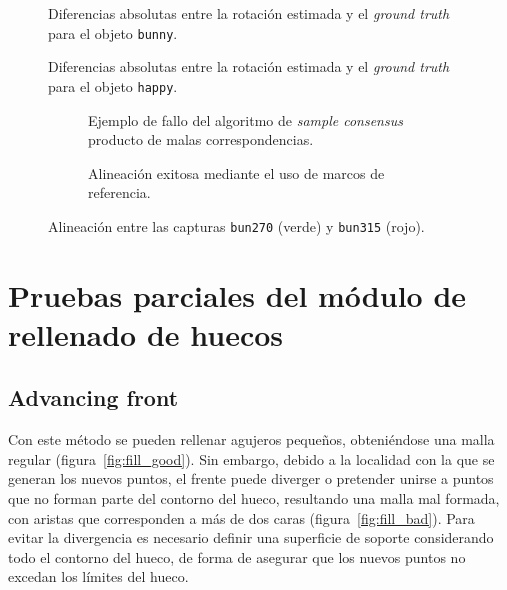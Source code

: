 	\begin{figure}
		\caption{\label{fig:sac_angles}}
	\end{figure}


\begin{figure}
	\resizebox{.9\linewidth}{!}{}
	\caption{\label{fig:clust_bunny}Diferencias absolutas entre la rotación estimada y el \emph{ground truth} para el objeto \texttt{bunny}.}
\end{figure}

\begin{figure}
	\resizebox{.9\linewidth}{!}{}
	\caption{\label{fig:clust_happy}Diferencias absolutas entre la rotación estimada y el \emph{ground truth} para el objeto \texttt{happy}.}
\end{figure}

\begin{figure}
	\centering
	\begin{subfigure}{.8\linewidth}
		\caption{\label{fig:align_sac}Ejemplo de fallo del algoritmo de \emph{sample consensus} producto de malas correspondencias.}
	\end{subfigure}
	\begin{subfigure}{.8\linewidth}
		\caption{\label{fig:clust_bun_good}Alineación exitosa mediante el uso de marcos de referencia.}
	\end{subfigure}
	\caption{Alineación entre las capturas \texttt{bun270} (verde) y \texttt{bun315} (rojo).}
\end{figure}

\section{Pruebas parciales del módulo de rellenado de huecos}
\subsection{Advancing front}
		Con este método se pueden rellenar agujeros pequeños, obteniéndose una malla regular (figura~\ref{fig:fill_good}).
		Sin embargo, debido a la localidad con la que se generan los nuevos
		puntos, el frente puede diverger o pretender unirse a puntos que no
		forman parte del contorno del hueco, resultando una malla mal formada,
		con aristas que corresponden a más de dos caras (figura~\ref{fig:fill_bad}).
		Para evitar la divergencia es necesario definir una superficie de
		soporte considerando todo el contorno del hueco, de forma de asegurar
		que los nuevos puntos no excedan los límites del hueco.


